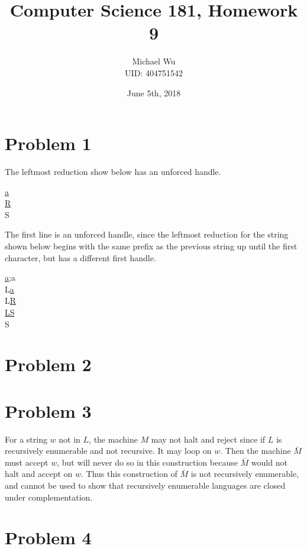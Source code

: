 \documentclass[12pt]{article}
\begin{document}
\title{Computer Science 181, Homework 9}
\date{June 5th, 2018}
\author{Michael Wu\\UID: 404751542}
\maketitle

\section*{Problem 1}

The leftmost reduction show below has an unforced handle.
\begin{center}
        \underline{a}\\
        \underline{R}\\
        S
\end{center}
The first line is an unforced handle, since the leftmost reduction for the string shown below begins with the same prefix as the previous string
up until the first character, but has a different first handle.
\begin{center}
        \underline{a;}a\\
        L\underline{a}\\
        L\underline{R}\\
        \underline{LS}\\
        S
\end{center}

\section*{Problem 2}

\section*{Problem 3}

For a string \(w\) not in \(L\), the machine \(M\) may not halt and reject since if \(L\) is recursively enumerable and not recursive. It may
loop on \(w\). Then the machine \(\bar{M}\) must accept \(w\), but will never do so in this construction because \(\bar{M}\) would not halt
and accept on \(w\). Thus this construction of \(\bar{M}\) is not recursively enumerable, and cannot be used to show that recursively
enumerable languages are closed under complementation.

\section*{Problem 4}
\end{document}
